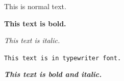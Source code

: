 \documentclass[12pt]{article}
\begin{document}
This is normal text.

\textbf{This text is bold.}

\textit{This text is italic.}

\texttt{This text is in typewriter font.}

\textbf{\textit{This text is bold and italic.}}
\end{document}
